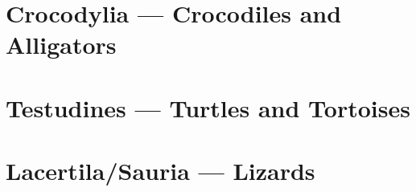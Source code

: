 \documentclass{article}
\begin{document}
\tableofcontents
\pagebreak
\section{Crocodylia --- Crocodiles and Alligators}

\pagebreak

\pagebreak
\section{Testudines --- Turtles and Tortoises}

\pagebreak

\pagebreak

\pagebreak

\pagebreak

\pagebreak

\pagebreak

\pagebreak

\pagebreak

\pagebreak

\pagebreak

\pagebreak

\pagebreak

\pagebreak

\pagebreak

\pagebreak

\pagebreak

\pagebreak
\section{Lacertila/Sauria --- Lizards}
\end{document}
